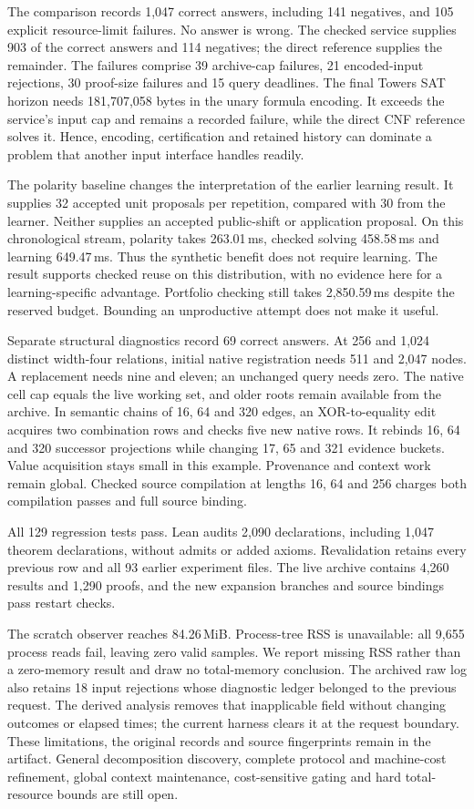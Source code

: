 \documentclass[11pt,a4paper]{article}
\numberwithin{equation}{section}
\theoremstyle{plain}
\theoremstyle{definition}
\theoremstyle{remark}
\begin{document}
The comparison records 1,047 correct answers, including 141 negatives, and 105 explicit resource-limit failures. No answer is wrong. The checked service supplies 903 of the correct answers and 114 negatives; the direct reference supplies the remainder. The failures comprise 39 archive-cap failures, 21 encoded-input rejections, 30 proof-size failures and 15 query deadlines. The final Towers SAT horizon needs 181,707,058 bytes in the unary formula encoding. It exceeds the service's input cap and remains a recorded failure, while the direct CNF reference solves it. Hence, encoding, certification and retained history can dominate a problem that another input interface handles readily.

The polarity baseline changes the interpretation of the earlier learning result. It supplies 32 accepted unit proposals per repetition, compared with 30 from the learner. Neither supplies an accepted public-shift or application proposal. On this chronological stream, polarity takes 263.01\,ms, checked solving 458.58\,ms and learning 649.47\,ms. Thus the synthetic benefit does not require learning. The result supports checked reuse on this distribution, with no evidence here for a learning-specific advantage. Portfolio checking still takes 2,850.59\,ms despite the reserved budget. Bounding an unproductive attempt does not make it useful.

Separate structural diagnostics record 69 correct answers. At 256 and 1,024 distinct width-four relations, initial native registration needs 511 and 2,047 nodes. A replacement needs nine and eleven; an unchanged query needs zero. The native cell cap equals the live working set, and older roots remain available from the archive. In semantic chains of 16, 64 and 320 edges, an XOR-to-equality edit acquires two combination rows and checks five new native rows. It rebinds 16, 64 and 320 successor projections while changing 17, 65 and 321 evidence buckets. Value acquisition stays small in this example. Provenance and context work remain global. Checked source compilation at lengths 16, 64 and 256 charges both compilation passes and full source binding.

All 129 regression tests pass. Lean audits 2,090 declarations, including 1,047 theorem declarations, without admits or added axioms. Revalidation retains every previous row and all 93 earlier experiment files. The live archive contains 4,260 results and 1,290 proofs, and the new expansion branches and source bindings pass restart checks.

The scratch observer reaches 84.26\,MiB. Process-tree RSS is unavailable: all 9,655 process reads fail, leaving zero valid samples. We report missing RSS rather than a zero-memory result and draw no total-memory conclusion. The archived raw log also retains 18 input rejections whose diagnostic ledger belonged to the previous request. The derived analysis removes that inapplicable field without changing outcomes or elapsed times; the current harness clears it at the request boundary. These limitations, the original records and source fingerprints remain in the artifact. General decomposition discovery, complete protocol and machine-cost refinement, global context maintenance, cost-sensitive gating and hard total-resource bounds are still open.
\end{document}

